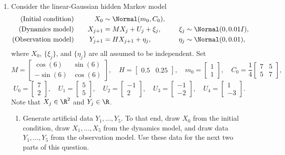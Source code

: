 \begin{enumerate}
\item[9.3] Consider the linear-Gaussian hidden Markov model
\begin{alignat*}{3}
  \text{(Initial condition)}  &\quad& X_0 &\sim \Normal(m_0, C_0), \\
  \text{(Dynamics model)}     &\quad& X_{j+1} &= MX_j + U_j + \xi_j, &\quad
    \xi_j &\sim \Normal(0, 0.01I), \\
  \text{(Observation model)}  &\quad& Y_{j+1} &= HX_{j+1} + \eta_j, &\quad
    \eta_j &\sim \Normal(0, 0.01),
\end{alignat*}
where $X_0$, $\{\xi_j\}$, and $\{\eta_j\}$ are all assumed to be independent. Set
\[
  M = \begin{bmatrix} \cos(6) & \sin(6) \\ -\sin(6) & \cos(6) \end{bmatrix},
  \quad
  H = \begin{bmatrix} 0.5 & 0.25 \end{bmatrix},
  \quad
  m_0 = \begin{bmatrix} 1 \\ 1 \end{bmatrix},
  \quad
  C_0 = \frac{1}{4}\begin{bmatrix} 7 & 5 \\ 5 & 7 \end{bmatrix},
\]
\[
  U_0 = \begin{bmatrix} 7 \\ 2 \end{bmatrix},\quad
  U_1 = \begin{bmatrix} 5 \\ 5 \end{bmatrix},\quad
  U_2 = \begin{bmatrix} -1 \\ 2 \end{bmatrix},\quad
  U_3 = \begin{bmatrix} -1 \\ -2 \end{bmatrix},\quad
  U_4 = \begin{bmatrix} 1 \\ -3 \end{bmatrix}.
\]
Note that $X_j \in \R^2$ and $Y_j \in \R$.

\begin{enumerate}[label=\alph*)]
  \item Generate artificial data $Y_1, \ldots, Y_5$. To that end, draw $X_0$ from the
    initial condition, draw $X_1, \ldots, X_5$ from the dynamics model, and draw data
    $Y_1, \ldots, Y_5$ from the observation model. Use these data for the next two parts
    of this question.


\end{enumerate}
\end{enumerate}
